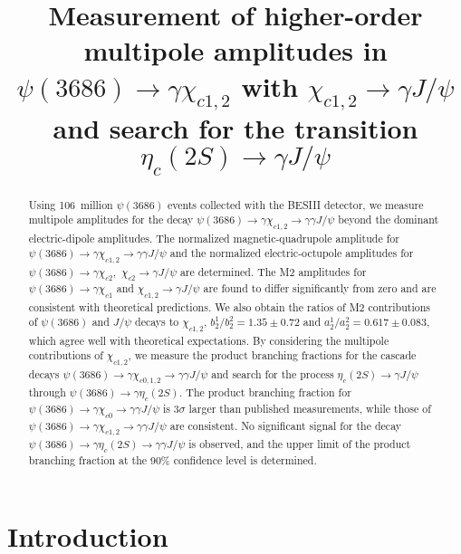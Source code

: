 \documentclass[prd,twocolumn,showpacs,amsmath,amssymb]{revtex4-1}
\begin{document}
\title{\boldmath Measurement of higher-order multipole amplitudes in
  $\psi(3686)\rightarrow\gamma\chi_{c1,2}$ with $\chi_{c1,2}\to\gamma J/\psi$
  and search for the  transition $\eta_{c}(2S)\to\gamma J/\psi$}





\begin{abstract}
  Using 106~million $\psi(3686)$ events collected with the BESIII
  detector, we measure multipole amplitudes for the decay
  $\psi(3686)\rightarrow\gamma\chi_{c1,2}\to\gamma\gamma J/\psi$
  beyond the dominant electric-dipole amplitudes.  The normalized
  magnetic-quadrupole amplitude for
  $\psi(3686)\rightarrow\gamma\chi_{c1,2}\rightarrow\gamma\gamma
  J/\psi$ and the normalized electric-octupole amplitudes for
  $\psi(3686)\rightarrow\gamma\chi_{c2}$,~$\chi_{c2}\rightarrow\gamma
  J/\psi$ are determined. The M2 amplitudes for
  $\psi(3686)\rightarrow\gamma\chi_{c1}$ and
  $\chi_{c1,2}\rightarrow\gamma J/\psi$ are found to differ
  significantly from zero and are consistent with theoretical
  predictions.  We also obtain the ratios of M2 contributions
  of $\psi(3686)$ and $J/\psi$ decays to $\chi_{c1,2}$,
  $b_{2}^{1}/b_{2}^{2} = 1.35\pm0.72$ and
  $a_{2}^{1}/a_{2}^{2} = 0.617\pm0.083$, which agree well with
  theoretical expectations.  By considering the multipole
  contributions of $\chi_{c1,2}$, we measure the product branching
  fractions for the cascade decays
  $\psi(3686)\rightarrow\gamma\chi_{c0,1,2}\to\gamma\gamma J/\psi$ and
  search for the process $\eta_{c}(2S)\to\gamma J/\psi$ through
  $\psi(3686)\rightarrow\gamma\eta_{c}(2S)$. The product branching
  fraction for
  $\psi(3686)\rightarrow\gamma\chi_{c0}\to\gamma\gamma J/\psi$ is
  3$\sigma$ larger than published measurements, while those of
  $\psi(3686)\rightarrow\gamma\chi_{c1,2}\to\gamma\gamma J/\psi$ are
  consistent.  No significant signal for the
  decay $\psi(3686)\to\gamma \eta_c(2S)\to\gamma \gamma J/\psi$ is observed,
  and the upper limit of the product branching fraction at the 90\%
  confidence level is determined.
\end{abstract}



\maketitle

\section{Introduction}\label{intro}
\end{document}
